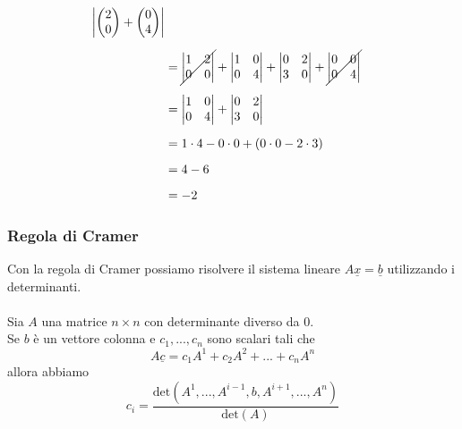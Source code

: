 \documentclass[italian]{article}
\newcommand\x{\times}
\renewcommand{\det}[1]{\text{det$\left(#1\right)$}}
\begin{document}
\begin{gather*}
\begin{split}
\begin{vmatrix}
\begin{pmatrix}
				2 \\ 0
			\end{pmatrix}
			+
			\begin{pmatrix}
				0 \\ 4
			\end{pmatrix} 
		\end{vmatrix} 
		\\[2mm]
		&=
		\cancel{
			\begin{vmatrix}
				1 & 2 \\ 0 & 0
			\end{vmatrix}
		}
		+
		\begin{vmatrix}
			1 & 0 \\ 0 & 4
		\end{vmatrix}
		+
		\begin{vmatrix}
			0 & 2 \\ 3 & 0
		\end{vmatrix}
		+
		\cancel{
			\begin{vmatrix}
				0 & 0 \\ 0 & 4
			\end{vmatrix}
		}
		\\[2mm]
		&=
		\begin{vmatrix}
			1 & 0 \\ 0 & 4
		\end{vmatrix}
		+
		\begin{vmatrix}
			0 & 2 \\  3 & 0
		\end{vmatrix}
		\\[2mm]
		&= 1\cdot 4 - 0\cdot 0 + (0\cdot 0 - 2\cdot 3) \\[2mm]
		&= 4 - 6 \\[2mm]
		&= -2
	\end{split}
\end{gather*}
\newpage
\subsubsection{Regola di Cramer}
Con la regola di Cramer possiamo risolvere il sistema lineare $A\underline{x}=\underline{b}$ utilizzando i determinanti.\\\\
Sia $A$ una matrice $n\x n$ con determinante diverso da 0.\\Se $b$ è un vettore colonna e $c_1,...,c_n$ sono scalari tali che 
\[
	A\underline{c} = c_1A^1 + c_2A^2 + ... + c_nA^n
\]
allora abbiamo
\[
	c_i = \dfrac{\det{A^1,...,A^{i-1},b,A^{i+1},...,A^n}}{\det{A}}
\]
\end{document}
